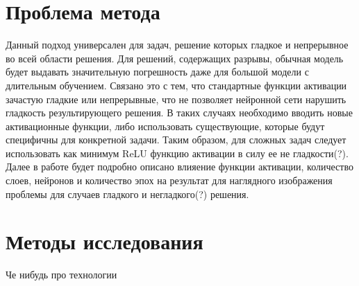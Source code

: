 \section{Проблема метода}
Данный подход универсален для задач, решение которых гладкое и непрерывное во всей области решения. Для решений, содержащих
разрывы, обычная модель будет выдавать значительную погрешность даже для большой модели с длительным обучением. Связано это с тем,
что стандартные функции активации зачастую гладкие или непрерывные, что не позволяет нейронной сети нарушить гладкость
результирующего решения. В таких случаях необходимо вводить новые активационные функции, либо использовать существующие,
которые будут специфичны для конкретной задачи. Таким образом, для сложных задач следует использовать как минимум ReLU
функцию активации в силу ее не гладкости(?). Далее в работе будет подробно описано влияение функции активации, количество слоев,
нейронов и количество эпох на результат для наглядного изображения проблемы для случаев гладкого и негладкого(?) решения.


\section{Методы исследования}
Че нибудь про технологии